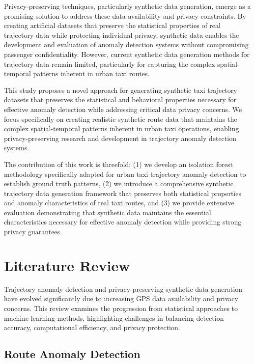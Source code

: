 \documentclass[runningheads]{llncs}
\begin{document}
Privacy-preserving techniques, particularly synthetic data generation, emerge as a promising solution to address these data availability and privacy constraints. By creating artificial datasets that preserve the statistical properties of real trajectory data while protecting individual privacy, synthetic data enables the development and evaluation of anomaly detection systems without compromising passenger confidentiality. However, current synthetic data generation methods for trajectory data remain limited, particularly for capturing the complex spatial-temporal patterns inherent in urban taxi routes.

This study proposes a novel approach for generating synthetic taxi trajectory datasets that preserves the statistical and behavioral properties necessary for effective anomaly detection while addressing critical data privacy concerns. We focus specifically on creating realistic synthetic route data that maintains the complex spatial-temporal patterns inherent in urban taxi operations, enabling privacy-preserving research and development in trajectory anomaly detection systems.

The contribution of this work is threefold: (1) we develop an isolation forest methodology specifically adapted for urban taxi trajectory anomaly detection to establish ground truth patterns, (2) we introduce a comprehensive synthetic trajectory data generation framework that preserves both statistical properties and anomaly characteristics of real taxi routes, and (3) we provide extensive evaluation demonstrating that synthetic data maintains the essential characteristics necessary for effective anomaly detection while providing strong privacy guarantees.

\section{Literature Review}
\label{sec:literature-review}

Trajectory anomaly detection and privacy-preserving synthetic data generation have evolved significantly due to increasing GPS data availability and privacy concerns. This review examines the progression from statistical approaches to machine learning methods, highlighting challenges in balancing detection accuracy, computational efficiency, and privacy protection.

\subsection{Route Anomaly Detection}
\label{sec:detection-review}
\end{document}
